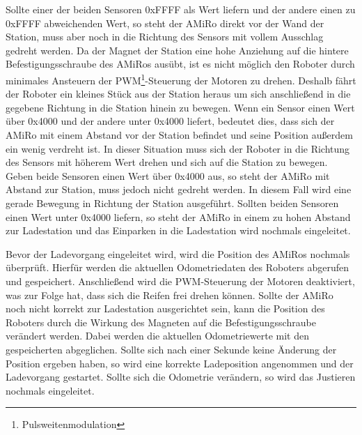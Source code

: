 Sollte einer der beiden Sensoren 0xFFFF als Wert liefern und der andere einen zu 0xFFFF abweichenden Wert, so steht der AMiRo direkt vor der Wand der Station, muss aber noch in die Richtung des Sensors mit vollem Ausschlag gedreht werden. Da der Magnet der Station eine hohe Anziehung auf die hintere Befestigungsschraube des AMiRos ausübt, ist es nicht möglich den Roboter durch minimales Ansteuern der PWM\footnote{Pulsweitenmodulation}-Steuerung der Motoren zu drehen. Deshalb fährt der Roboter ein kleines Stück aus der Station heraus um sich anschließend in die gegebene Richtung in die Station hinein zu bewegen. 
Wenn ein Sensor einen Wert über 0x4000 und der andere unter 0x4000 liefert, bedeutet dies, dass sich der AMiRo mit einem Abstand vor der Station befindet und seine Position außerdem ein wenig verdreht ist. In dieser Situation muss sich der Roboter in die Richtung des Sensors mit höherem Wert drehen und sich auf die Station zu bewegen. 
Geben beide Sensoren einen Wert über 0x4000 aus, so steht der AMiRo mit Abstand zur Station, muss jedoch nicht gedreht werden. In diesem Fall wird eine gerade Bewegung in Richtung der Station ausgeführt. 
Sollten beiden Sensoren einen Wert unter 0x4000 liefern, so steht der AMiRo in einem zu hohen Abstand zur Ladestation und das Einparken in die Ladestation wird nochmals eingeleitet.

Bevor der Ladevorgang eingeleitet wird, wird die Position des AMiRos nochmals überprüft. Hierfür werden die aktuellen Odometriedaten des Roboters abgerufen und gespeichert. Anschließend wird die PWM-Steuerung der Motoren deaktiviert, was zur Folge hat, dass sich die Reifen frei drehen können. Sollte der AMiRo noch nicht korrekt zur Ladestation ausgerichtet sein, kann die Position des Roboters durch die Wirkung des Magneten auf die Befestigungsschraube verändert werden. Dabei werden die aktuellen Odometriewerte mit den gespeicherten abgeglichen. Sollte sich nach einer Sekunde keine Änderung der Position ergeben haben, so wird eine korrekte Ladeposition angenommen und der Ladevorgang gestartet. Sollte sich die Odometrie verändern, so wird das Justieren nochmals eingeleitet. 





